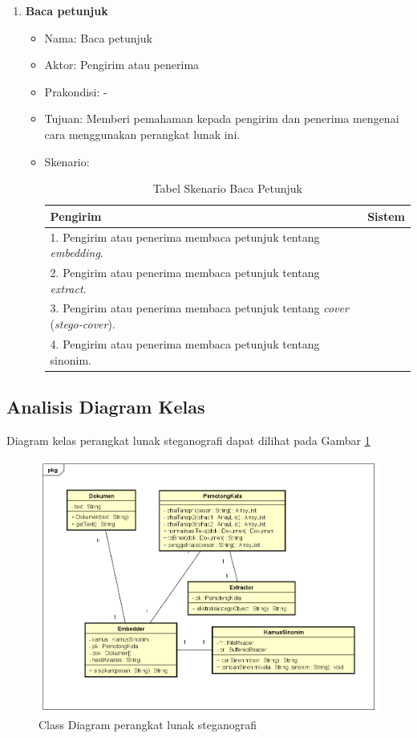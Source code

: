\begin{enumerate}
	\item \textbf{Baca petunjuk}
	\begin{itemize}
		\item Nama: Baca petunjuk
		\item Aktor: Pengirim atau penerima
		\item Prakondisi: -
		\item Tujuan: Memberi pemahaman kepada pengirim dan penerima mengenai cara menggunakan perangkat lunak ini.
		\item Skenario:
		\begin{table}[H]
		\centering
		\caption{Tabel Skenario Baca Petunjuk}
		\begin{tabular}{| p{6.5cm} | p{6.5cm} |}\hline
		Pengirim & Sistem \\
		\hline
				1. Pengirim atau penerima membaca petunjuk tentang \textit{embedding}. & \\
				\hline
				2. Pengirim atau penerima membaca petunjuk tentang \textit{extract}. & \\
				\hline
				3. Pengirim atau penerima membaca petunjuk tentang \textit{cover} (\textit{stego-cover}). & \\
				\hline
				4. Pengirim atau penerima membaca petunjuk tentang sinonim. & \\
		\hline
		\end{tabular}
		\end{table}
	\end{itemize}
\end{enumerate}

\subsection{Analisis Diagram Kelas}

Diagram kelas perangkat lunak steganografi dapat dilihat pada Gambar \ref{fig:3_classdiagram}

\begin{figure}[H]
	\centering
	\includegraphics[scale=0.6]{Gambar/classdiagram}
	\caption{Class Diagram perangkat lunak steganografi} 
	\label{fig:3_classdiagram}
\end{figure}

